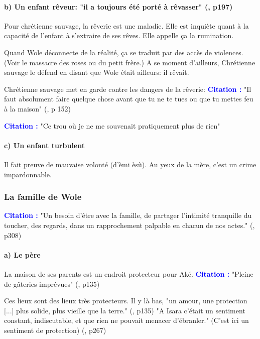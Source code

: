 \documentclass[a4paper, 11pt, hidelinks]{article}
\newcommand{\cit}{\large \textcolor{blue}{\textbf{Citation :}} \large }
\newcommand{\rb}[1]{\Romanbar{#1}}
\begin{document}
\paragraph{b) Un enfant rêveur: "il a toujours été porté à rêvasser" (\rb{7}, p197)}


Pour chrétienne sauvage, la rêverie est une maladie. Elle est inquiète quant à la capacité de l'enfant à s'extraire de ses rêves.
Elle appelle ça la rumination.

Quand Wole déconnecte de la réalité, ça se traduit par des accès de violences. (Voir le massacre des roses ou du petit frère.)
A se moment d'ailleurs, Chrétienne sauvage le défend en disant que Wole était ailleurs: il rêvait.


Chrétienne sauvage met en garde contre les dangers de la rêverie:
\cit "Il faut absolument faire quelque chose avant que tu ne te tues ou que tu mettes feu à la maison" (\rb{5}, p 152)


\cit "Ce trou où je ne me souvenait pratiquement plus de rien" 

\paragraph{c) Un enfant turbulent}



Il fait preuve de mauvaise volonté (d'èmi èsù). Au yeux de la mère, c'est un crime impardonnable.


\subsubsection{La famille de Wole}


\cit "Un besoin d'être avec la famille, de partager l'intimité tranquille du toucher, des regards, dans un rapprochement palpable en chacun de nos actes." (\rb{11}, p308)


\paragraph{a) Le père}


La maison de ses parents est un endroit protecteur pour Aké.
\cit "Pleine de gâteries imprévues" (\rb{5}, p135)

Ces lieux sont des lieux très protecteurs. Il y là bas, "un amour, une protection [...] plus solide, plus vieille que la terre." (\rb{5}, p135)
"A Isara c'était un sentiment constant, indiscutable, et que rien ne pouvait menacer d'ébranler." (C'est ici un sentiment de protection) (\rb{9}, p267)
\end{document}
